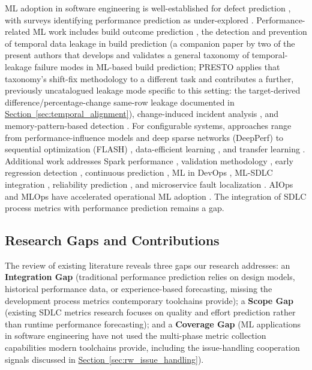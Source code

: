 \documentclass[technologies,article,submit,pdftex,moreauthors]{Definitions/mdpi}
\begin{document}
ML adoption in software engineering is well-established for defect prediction \citep{menzies2007, hall2012}, with surveys identifying performance prediction as under-explored \citep{zhang2019, allamanis2018}. Performance-related ML work includes build outcome prediction \citep{chen2020buildfast}, the detection and prevention of temporal data leakage in build prediction \citep{mishra2026leakage} (a companion paper by two of the present authors that develops and validates a general taxonomy of temporal-leakage failure modes in ML-based build prediction; PRESTO applies that taxonomy's shift-fix methodology to a different task and contributes a further, previously uncatalogued leakage mode specific to this setting: the target-derived difference/percentage-change same-row leakage documented in \hyperref[sec:temporal_alignment]{Section~\ref*{sec:temporal_alignment}}), change-induced incident analysis \citep{wu2023incidents}, and memory-pattern-based detection \citep{nistor2013}. For configurable systems, approaches range from performance-influence models \citep{siegmund2015} and deep sparse networks (DeepPerf) \citep{ha2019} to sequential optimization (FLASH) \citep{nair2020}, data-efficient learning \citep{guo2018}, and transfer learning \citep{jamshidi2017, jamshidi2018}. Additional work addresses Spark performance \citep{sparkml2019}, validation methodology \citep{tantithamthavorn2016}, early regression detection \citep{earlydetection2024}, continuous prediction \citep{pace2023}, ML in DevOps \citep{mldevops2022}, ML-SDLC integration \citep{mlsdlc2024}, reliability prediction \citep{reliability2025}, and microservice fault localization \citep{zhou2019}. AIOps and MLOps have accelerated operational ML adoption \citep{dang2019, notaro2021, diazdearcaya2024}. The integration of SDLC process metrics with performance prediction remains a gap.

\subsection{Research Gaps and Contributions}\label{sec:rw_gaps}

The review of existing literature reveals three gaps our research addresses: an \textbf{Integration Gap} (traditional performance prediction relies on design models, historical performance data, or experience-based forecasting, missing the development process metrics contemporary toolchains provide); a \textbf{Scope Gap} (existing SDLC metrics research focuses on quality and effort prediction rather than runtime performance forecasting); and a \textbf{Coverage Gap} (ML applications in software engineering have not used the multi-phase metric collection capabilities modern toolchains provide, including the issue-handling cooperation signals discussed in \hyperref[sec:rw_issue_handling]{Section~\ref*{sec:rw_issue_handling}}).
\end{document}
